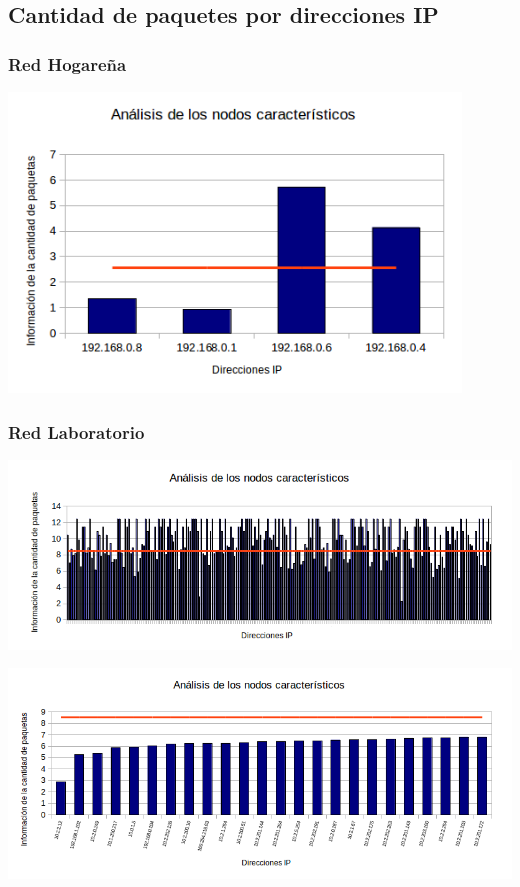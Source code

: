 \subsection{Cantidad de paquetes por direcciones IP}


\subsubsection{Red Hogareña}

\centerline{\includegraphics[width=0.9\textwidth]{./graficos/paquetesVSIP/casa_mari.png}}

\subsubsection{Red Laboratorio}

\centerline{\includegraphics[width=1\textwidth]{./graficos/paquetesVSIP/labo5_muchos.png}}
\centerline{\includegraphics[width=1\textwidth]{./graficos/paquetesVSIP/labo5.png}}

